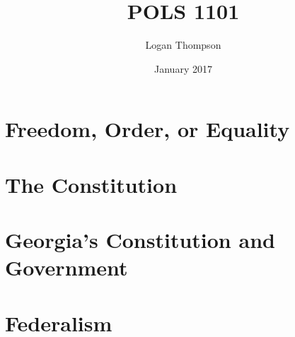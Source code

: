 \documentclass[12pt]{report}
\title{POLS 1101}
\author{Logan Thompson }
\date{January 2017}
\begin{document}
\maketitle
\tableofcontents
\chapter{Freedom, Order, or Equality}

\chapter{The Constitution}

\chapter{Georgia's Constitution and Government}

\chapter{Federalism}

\end{document}
